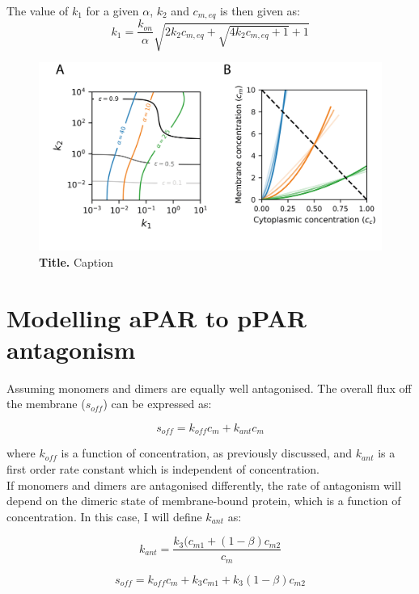 \documentclass[12pt]{"report"}
\newcommand{\mycaption}[2]{\caption[#1]{\textbf{#1.} #2}}
\begin{document}
The value of $k_1$ for a given $\alpha$, $k_2$ and $c_{m, eq}$ is then given as:
\begin{equation}
k_1 = \frac{k_{on}}{\alpha} \sqrt{2 k_2 c_{m, eq} + \sqrt{4 k_2 c_{m, eq} + 1 } + 1}
\end{equation}

\begin{figure}
\includegraphics[scale=1]{epsilon_vs_koff}
\centering
\mycaption{Title}{Caption}
\label{fig:epsilon_vs_koff}
\end{figure}


\section{Modelling aPAR to pPAR antagonism}

Assuming monomers and dimers are equally well antagonised. The overall flux off the membrane ($s_{off}$) can be expressed as:

\begin{equation}
s_{off} = k_{off} c_m + k_{ant} c_m
\end{equation} 

where $k_{off}$ is a function of concentration, as previously discussed, and $k_{ant}$ is a first order rate constant which is independent of concentration.\\

If monomers and dimers are antagonised differently, the rate of antagonism will depend on the dimeric state of membrane-bound protein, which is a function of concentration. In this case, I will define $k_{ant}$ as:

\begin{equation}
k_{ant} = \frac{k_3 (c_{m1} + (1 - \beta) c_{m2}}{c_{m}}
\end{equation} 

\begin{equation}
s_{off} = k_{off} c_m + k_3 c_{m1} + k_3 (1 - \beta) c_{m2}
\end{equation} 
\end{document}

